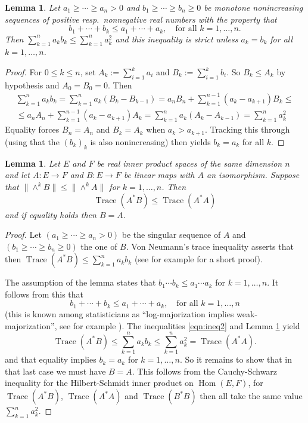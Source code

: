 \documentclass[11pt,letterpaper]{amsart}
\newtheorem{lemma}[theorem]{Lemma}
\theoremstyle{definition}
\numberwithin{equation}{section}
\theoremstyle{definition}
\DeclareMathOperator{\Hom}{Hom}
\DeclareMathOperator{\tr}{Trace}
\begin{document}
\begin{lemma}\label{lemma:ineq1}
Let $a_1\ge \cdots \ge a_n>0$ and $b_1\ge \cdots \ge b_n\ge 0$ be monotone nonincreasing sequences of positive resp.\ nonnegative real numbers with the property that
\[
b_1+\cdots +b_k\le a_1+\cdots +a_k, \quad  \text{for all $k=1, \dots, n$}. 
\]
Then  $\sum_{k=1}^n a_kb_k\le \sum_{k=1}^n a_k^2$  and this inequality is strict unless $a_k=b_k$ for all $k=1, \dots, n$.
\end{lemma}

\begin{proof}
For \(0\leq k\leq n\), set $A_k:=\sum_{i=1}^k a_i$ and $B_k:=\sum_{i=1}^k b_i$. So $B_k\le A_k$ by hypothesis  and 
$A_0=B_0=0$.  Then 
\begin{multline}
\textstyle  \sum_{k=1}^n a_kb_k= \sum_{k=1}^n a_k(B_k-B_{k-1}) =a_nB_n+ \sum_{k=1}^{n-1}(a_k-a_{k+1})B_k\le \\
\textstyle  \le a_nA_n+ \sum_{k=1}^{n-1}(a_k-a_{k+1})A_k=\sum_{k=1}^n  a_k(A_k-A_{k-1})=\sum_{k=1}^n a_k^2
\end{multline}
Equality forces $B_n=A_n$ and $B_k=A_k$ when $a_k>a_{k+1}$. Tracking this through (using that the $(b_k)_k$  is also nonincreasing)
then yields  $b_k=a_k$ for all $k$.
\end{proof}


\begin{lemma}\label{lemma:linalg}
Let $E$ and $F$ be real inner product  spaces of the same dimension $n$ and let $A: E\to F$ and $B: E\to F$ be linear maps with $A$ an isomorphism.  Suppose 
that $\|\wedge^k B\|\le  \|\wedge^kA\|$ for $k=1, \dots, n$. Then 
\[\tr(A^*B) \le \tr(A^*A)\] 
and if equality holds then $B=A$.
\end{lemma}
\begin{proof}
Let $(a_1\ge\cdots\ge a_n>0)$ be the singular sequence of $A$ and $(b_1\ge\cdots\ge b_n\ge 0)$ the one of 
$B$. Von Neumann's  trace inequality asserts that  then $\tr(A^*B)\le \sum_{k=1}^n a_k b_k$ (see for example \cite{Mirsky75}  for a short proof). 

The assumption of the lemma states that $b_1\cdots b_k\le a_1\cdots a_k$ for $k=1, \dots, n$.  It follows from this  that 
\begin{equation}\label{eqn:ineq2}
b_1+\cdots +b_k\le a_1+\cdots +a_k, \quad  \text{for all $k=1, \dots, n$}
\end{equation}
(this  is known among statisticians as ``log-majorization implies weak-majorization'', see for example \cite[Ch.\ 5 A.2.b]{MOA11}). 
The inequalities  \eqref{eqn:ineq2} and  Lemma \ref{lemma:ineq1} yield 
\[\label{eqn:ineq3}
\textstyle \tr (A^*B)\le \sum_{k=1}^n a_k b_k\le \sum_{k=1}^n a_k^2 =\tr(A^*A).
\]
and that equality implies  $b_k=a_k$ for $k=1, \dots, n$. So it remains to show that in that last case we must have $B=A$.
This follows from the Cauchy-Schwarz inequality for the  Hilbert-Schmidt inner product on $\Hom(E,F)$, for 
$\tr (A^*B)$, $\tr(A^*A)$ and $\tr(B^*B)$  then all take  the same value $\sum_{k=1}^n a_k^2$.
\end{proof}
\end{document}
